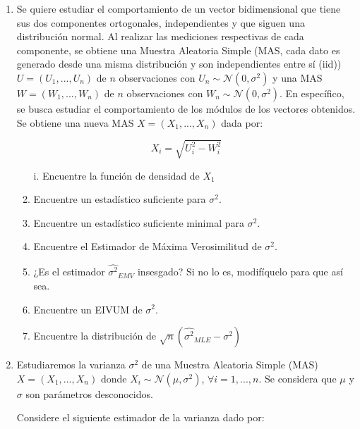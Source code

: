 \begin{enumerate}
    \item Se quiere estudiar el comportamiento de un vector bidimensional que tiene sus dos componentes ortogonales, independientes y que siguen una distribución normal. Al realizar las mediciones respectivas de cada componente, se obtiene una Muestra Aleatoria Simple (MAS, cada dato es generado desde una misma distribución y son independientes entre sí (iid)) $U=(U_1,...,U_n)$ de $n$ observaciones con $U_n\sim\mathcal{N}(0,\sigma^2)$  y una MAS $W=(W_1,...,W_n)$  de $n$ observaciones con $W_n\sim\mathcal{N}(0,\sigma^2)$. En específico, se busca estudiar el comportamiento de los módulos de los vectores obtenidos. Se obtiene una nueva MAS $X=(X_1,...,X_n)$ dada por:

\[X_i = \sqrt{U_i^2 - W_i^2}\]

\begin{enumerate}
    \item [i.] Encuentre la función de densidad de $X_1$\\
    \item Encuentre un estadístico suficiente para $\sigma^2$.
    \item Encuentre un estadístico suficiente minimal para $\sigma^2$.
    \item Encuentre el Estimador de Máxima Verosimilitud de $\sigma^2$.
    \item ¿Es el estimador $\widehat{\sigma^2}_{EMV}$ insesgado? Si no lo es, modifíquelo para que así sea.
    \item Encuentre un EIVUM de $\sigma^2$.
    \item Encuentre la distribución de  $\sqrt{n}(\widehat{\sigma^2}_{MLE}-\sigma^2)$
\end{enumerate}

\item Estudiaremos la varianza $\sigma^2$ de una Muestra Aleatoria Simple (MAS) $X=(X_1,...,X_n)$ donde $X_i\sim\mathcal{N}(\mu, \sigma^2)$, $\forall i =1,...,n$. Se considera que $\mu$ y $\sigma$ son parámetros desconocidos. 

Considere el siguiente estimador de la varianza dado por:


\end{enumerate}

